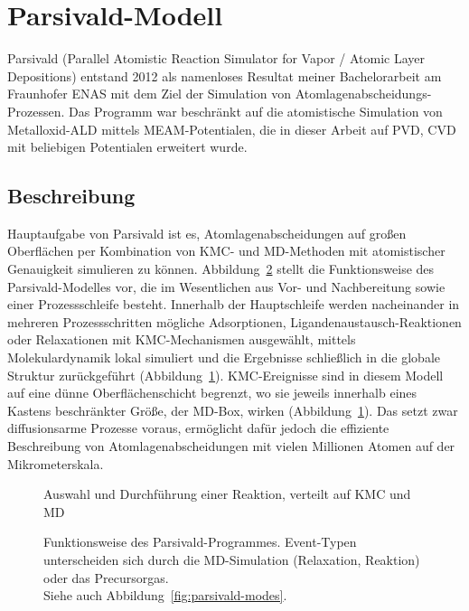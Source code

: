 \section{Parsivald-Modell}
\label{parsivald}

Parsivald (Parallel Atomistic Reaction Simulator for Vapor / Atomic Layer Depositions) entstand 2012 als namenloses Resultat meiner Bachelorarbeit\cite{lorenz_entwicklung_2012} am Fraunhofer ENAS mit dem Ziel der Simulation von Atom\-lagen\-abscheidungs-Prozessen.
Das Programm war beschränkt auf die atomistische Simulation von Metall\-oxid-ALD mittels MEAM-Potentialen, die in dieser Arbeit auf PVD, CVD mit beliebigen Potentialen erweitert wurde.

\subsection{Beschreibung}

Hauptaufgabe von Parsivald ist es, Atomlagenabscheidungen auf großen Oberflächen per Kombination von KMC- und MD-Methoden mit atomistischer Genauigkeit simulieren zu können.
Abbildung~\ref{fig:parsivald-stephierarchy} stellt die Funktionsweise des Parsivald-Modelles vor, die im Wesentlichen aus Vor- und Nachbereitung sowie einer Prozessschleife besteht.
Innerhalb der Hauptschleife werden nacheinander in mehreren Prozessschritten mögliche Adsorptionen, Ligandenaustausch-Reaktionen oder Relaxationen mit KMC-Mechanismen ausgewählt, mittels Molekulardynamik lokal simuliert und die Ergebnisse schließlich in die globale Struktur zurückgeführt (Abbildung~\ref{fig:parsivald-schema}).
KMC-Ereignisse sind in diesem Modell auf eine dünne Oberflächenschicht begrenzt, wo sie jeweils innerhalb eines Kastens beschränkter Größe, der MD-Box, wirken (Abbildung~\ref{fig:parsivald-schema}).
Das setzt zwar diffusionsarme Prozesse voraus, ermöglicht dafür jedoch die effiziente Beschreibung von Atomlagenabscheidungen mit vielen Millionen Atomen auf der Mikrometerskala.

\begin{figure}
  \centering
  \def\svgwidth{\textwidth}
  
  \caption{Auswahl und Durchführung einer Reaktion, verteilt auf KMC und MD}
  \label{fig:parsivald-schema}
\end{figure}

\begin{figure}
  \centering
  \def\svgwidth{\textwidth}
  
  \caption[Funktionsweise des Parsivald-Programmes]{
    Funktionsweise des Parsivald-Programmes.
    Event-Typen unterscheiden sich durch die MD-Simulation (Relaxation, Reaktion) oder das Precursorgas.\\
    Siehe auch Abbildung~\ref{fig:parsivald-modes}.
  }
  \label{fig:parsivald-stephierarchy}
\end{figure}

